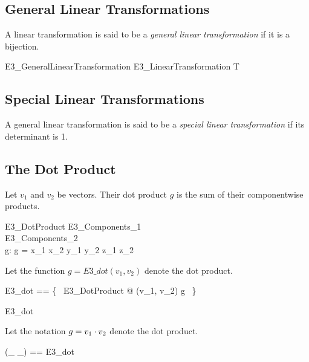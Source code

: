 \documentclass{amsart}
\begin{document}
\subsection{General Linear Transformations}

A linear transformation is said to be a \textit{general linear transformation} if it is a bijection.

\begin{schema}{E3\_GeneralLinearTransformation}
	E3\_LinearTransformation
\where
	T \in \Ethree \bij \Ethree
\end{schema}

\subsection{Special Linear Transformations}

A general linear transformation is said to be a \textit{special linear transformation} if its determinant is 1.

\subsection{The Dot Product}

Let $v_1$ and $v_2$ be vectors. Their dot product $g$ is the sum of their componentwise products.

\begin{schema}{E3\_DotProduct}
	E3\_Components_1 \\
	E3\_Components_2 \\
	g: \R
\where
	g = x_1 \mulR x_2 \addR y_1 \mulR y_2 \addR z_1 \mulR z_2
\end{schema}

Let the function $g = E3\_dot(v_1, v_2)$ denote the dot product.

\begin{zed}
	E3\_dot == \{~ E3\_DotProduct @ (v_1, v_2) \mapsto g ~\}
\end{zed}

\begin{remark}
\begin{zed}
	E3\_dot \in \Ethree \cross \Ethree \fun \R
\end{zed}
\end{remark}

Let the notation $g = v_1 \mathbin{\cdot} v_2$ denote the dot product.

\begin{zed}
	(\_ \dotEthree \_) == E3\_dot
\end{zed}
\end{document}
